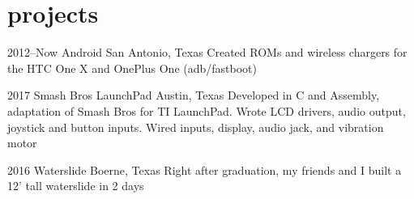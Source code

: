 \documentclass[]{friggeri-cv} %
\begin{document}

\section{projects}

\begin{entrylist}

	\entry
	{2012--Now}
	{Android}
	{San Antonio, Texas}
	{Created ROMs and wireless chargers for the HTC One X and OnePlus One (adb/fastboot)}


	\entry
	{2017}
	{Smash Bros LaunchPad}
	{Austin, Texas}
	{Developed in C and Assembly, adaptation of Smash Bros for TI LaunchPad. Wrote LCD drivers, audio output, joystick and button inputs. Wired inputs, display, audio jack, and vibration motor}


	\entry
	{2016}
	{Waterslide}
	{Boerne, Texas}
	{Right after graduation, my friends and I built a 12' tall waterslide in 2 days}

\end{entrylist}
\end{document}
